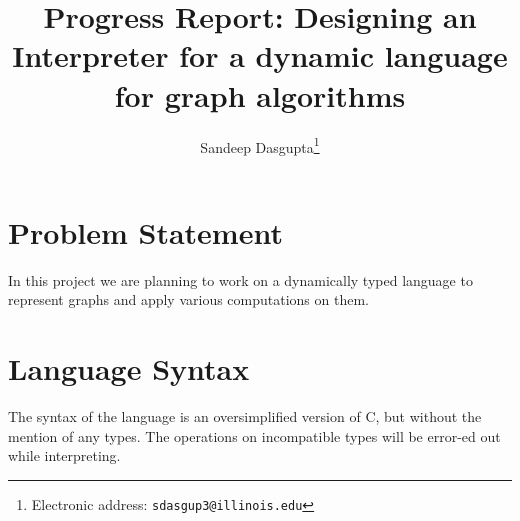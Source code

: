 \documentclass[12,twoside]{article}
\title{\textbf{Progress Report: Designing an Interpreter for a dynamic language 
  for graph algorithms}}
\author{Sandeep Dasgupta\thanks{Electronic address:
\texttt{sdasgup3@illinois.edu}}}
\begin{document}
\begin{titlepage}
\thispagestyle{empty}
\maketitle
\pagebreak
\end{titlepage}

\section{Problem Statement}

   In this project we are planning to work on a dynamically typed language to 
     represent graphs and apply various computations on them.
 
\section{Language Syntax}
  The syntax of the language is an oversimplified version  of C, but
    without the mention of any types. The operations on incompatible types
    will be error-ed out while interpreting.
\end{document}
